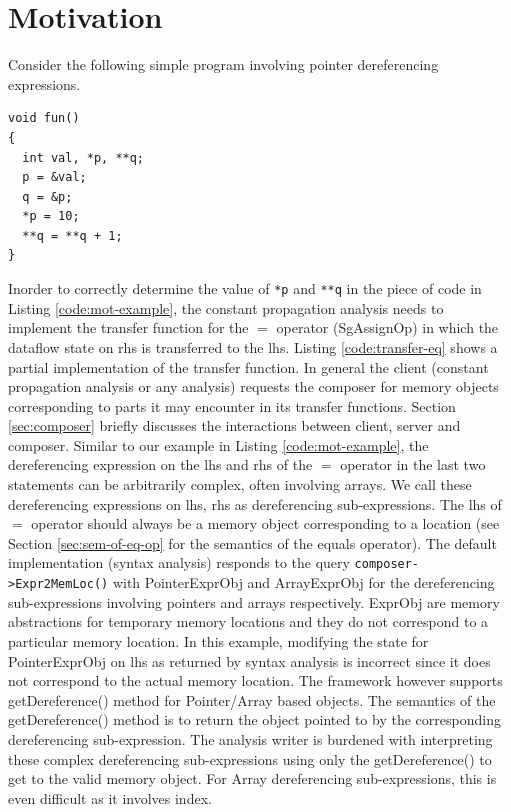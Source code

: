 \documentclass{article}
\begin{document}
\section{Motivation}
Consider the following simple program involving pointer dereferencing expressions.
\lstset{
caption=Motivating Example,
label=code:mot-example
}
\begin{lstlisting}
void fun()
{
  int val, *p, **q;
  p = &val;
  q = &p;
  *p = 10;
  **q = **q + 1;
}
\end{lstlisting}

\noindent Inorder to correctly determine the value of \texttt{*p} and \texttt{**q} in the piece of
code in  Listing \ref{code:mot-example}, the constant propagation analysis needs to
implement the transfer function for the $=$ operator (SgAssignOp) in which
the dataflow state on rhs is transferred to the lhs. Listing  \ref{code:transfer-eq} shows a partial
implementation  of the transfer function. In general the client
(constant propagation analysis or any analysis)  requests the composer for memory
objects  corresponding to parts it may encounter in its transfer
functions. Section \ref{sec:composer} briefly discusses the interactions between client, server and composer. Similar to our example in Listing \ref{code:mot-example},
the dereferencing expression on the lhs and rhs of the $=$ operator in the last two statements can be
arbitrarily  complex, often involving arrays. We call these dereferencing expressions on lhs, rhs as dereferencing sub-expressions. 
The lhs of $=$ operator should always be a memory object corresponding to a location (see Section
\ref{sec:sem-of-eq-op}  for the semantics of the equals operator).
The default implementation  (syntax analysis) responds to the query \texttt{composer->Expr2MemLoc()} with PointerExprObj and
ArrayExprObj  for the dereferencing sub-expressions involving pointers and arrays
respectively. ExprObj are memory abstractions for temporary memory locations and they do not correspond to a particular memory location.
In this example, modifying the state for PointerExprObj on lhs as returned by syntax analysis
is incorrect  since it does not correspond to the actual memory
location. The  framework however supports getDereference() method for
Pointer/Array based objects. The semantics of the getDereference()
method is  to return the object pointed to by the corresponding
dereferencing sub-expression. The analysis writer is burdened with
interpreting  these complex dereferencing sub-expressions using only the getDereference() to
get to the valid memory object. For Array dereferencing sub-expressions, this is even difficult as it involves index.
\end{document}
